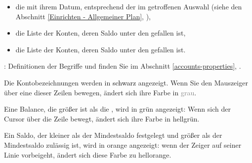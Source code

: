 \begin{itemize}
\begin{itemize}
			\item die  mit ihrem Datum, entsprechend der im  getroffenen Auswahl (siehe den Abschnitt \vref{Einrichten - Allgemeiner Plan}, ),%
			\item die Liste der Konten, deren Saldo unter den  gefallen ist,%
			\item die Liste der Konten, deren Saldo unter den  gefallen ist.%
		\end{itemize}
\end{itemize}


\Note{}: Definitionen der Begriffe  und  finden Sie im Abschnitt \vref{accounts-properties}, .%


Die Kontobezeichnungen werden in \textcolor{black}{schwarz} angezeigt. Wenn Sie den Mauszeiger über eine dieser Zeilen bewegen, ändert sich ihre Farbe in \textcolor{gray}{grau}.%

Eine Balance, die größer ist als die , wird in \textcolor[RGB]{0,126,0}{grün} angezeigt: Wenn sich der Cursor über die Zeile bewegt, ändert sich ihre Farbe in \textcolor[RGB]{0,227,0}{hellgrün}.%

Ein Saldo, der kleiner als der {Mindestsaldo festgelegt} und größer als der {Mindestsaldo zulässig} ist, wird in \textcolor[RGB]{230,155,0}{orange} angezeigt: wenn der Zeiger auf seiner Linie vorbeigeht, ändert sich diese Farbe zu \textcolor[RGB]{255,200,0}{hellorange}.%

